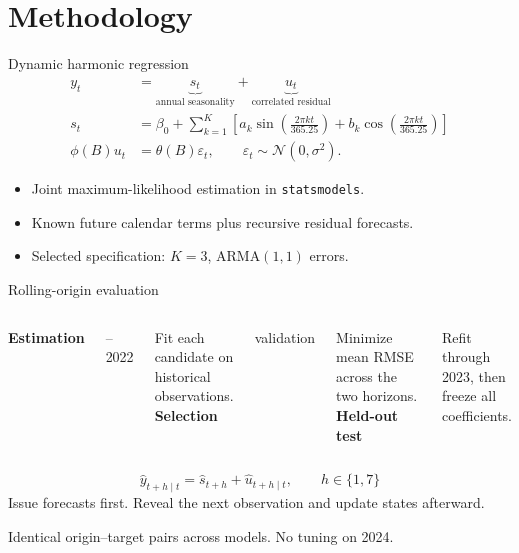 \documentclass[aspectratio=169,11pt]{beamer}
\begin{document}
\section{Methodology}
\begin{frame}{Dynamic harmonic regression}
\begin{align*}
y_t &= \underbrace{s_t}_{\text{annual seasonality}}+\underbrace{u_t}_{\text{correlated residual}}\\[2mm]
s_t &= \beta_0+\sum_{k=1}^{K}\left[a_k\sin\!\left(\frac{2\pi kt}{365.25}\right)
+b_k\cos\!\left(\frac{2\pi kt}{365.25}\right)\right]\\[2mm]
\phi(B)u_t &= \theta(B)\varepsilon_t,\qquad\varepsilon_t\sim\mathcal N(0,\sigma^2).
\end{align*}
\medskip
\begin{itemize}
\item Joint maximum-likelihood estimation in \texttt{statsmodels}.
\item Known future calendar terms plus recursive residual forecasts.
\item Selected specification: \alert{$K=3$, ARMA$(1,1)$ errors}.
\end{itemize}
\end{frame}

\begin{frame}{Rolling-origin evaluation}
\begin{columns}[T,onlytextwidth]
\textbf{Estimation}\par{}--2022\par\medskip
Fit each candidate on historical observations.
\textbf{Selection}\par{} validation\par\medskip
Minimize mean RMSE across the two horizons.
\textbf{Held-out test}\par{}\par\medskip
Refit through 2023, then freeze all coefficients.
\end{columns}
\bigskip
\[\widehat y_{t+h\mid t}=\widehat s_{t+h}+\widehat u_{t+h\mid t},\qquad h\in\{1,7\}\]
\bigskip
\alert{Issue forecasts first. Reveal the next observation and update states afterward.}\par
\medskip
\small Identical origin--target pairs across models. No tuning on 2024.
\end{frame}
\end{document}
